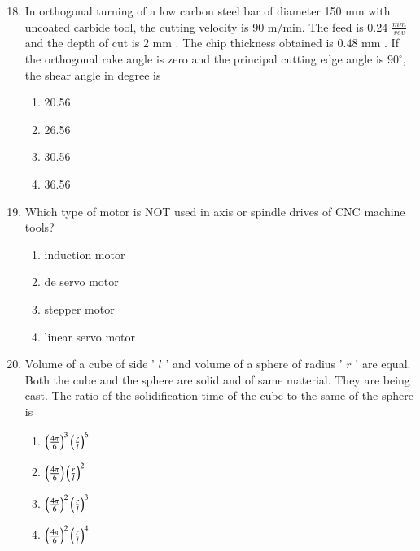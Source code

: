 \documentclass[journal]{IEEEtran}
\begin{document}
\begin{enumerate}
\setcounter{enumi}{17}
 

    \item In orthogonal turning of a low carbon steel bar of diameter 150 mm with uncoated carbide tool, the cutting velocity is 90 m/min. The feed is 0.24 $\frac{mm}{rev}$ and the depth of cut is 2 mm . The chip thickness obtained is 0.48 mm . If the orthogonal rake angle is zero and the principal cutting edge angle is $90^{\circ}$, the shear angle in degree is
        \begin{multicols}{4}
            \begin{enumerate}
                \item 20.56
                \item 26.56
                \item 30.56
                \item 36.56
            \end{enumerate}
        \end{multicols}


    \item Which type of motor is NOT used in axis or spindle drives of CNC machine tools?


		\begin{multicols}{1}
			\begin{enumerate}
	\item induction motor
    \item de servo motor
    \item stepper motor
    \item linear servo motor
			\end{enumerate}
		\end{multicols}


    \item Volume of a cube of side ' $l$ ' and volume of a sphere of radius ' $r$ ' are equal. Both the cube and the sphere are solid and of same material. They are being cast. The ratio of the solidification time of the cube to the same of the sphere is
        \begin{multicols}{4}
            \begin{enumerate}
              \item $\left(\frac{4 \pi}{6}\right)^{3}\left(\frac{r}{l}\right)^{6}$
              \item $\left(\frac{4 \pi}{6}\right)\left(\frac{r}{l}\right)^{2}$
              \item $\left(\frac{4 \pi}{6}\right)^{2}\left(\frac{r}{l}\right)^{3}$
              \item $\left(\frac{4 \pi}{6}\right)^{2}\left(\frac{r}{l}\right)^{4}$
            \end{enumerate}
        \end{multicols}



\end{enumerate}
\end{document}
